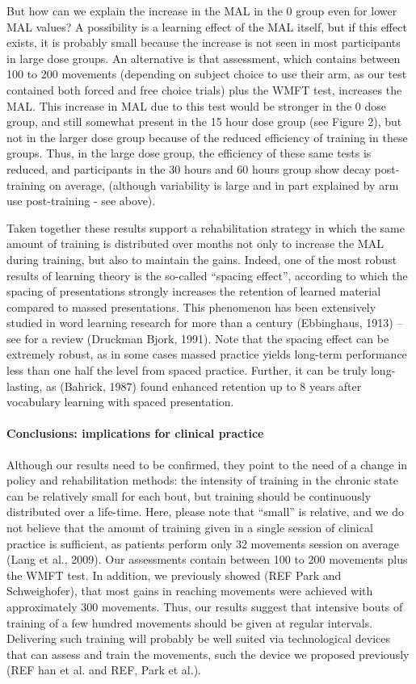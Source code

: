 But how can we explain the increase in the MAL in the 0 group even for lower MAL values? A possibility is a learning effect of the MAL itself, but if this effect exists, it is probably small because the increase is not seen in most participants in large dose groups. 
An alternative is that assessment, which contains between 100 to 200 movements (depending on subject choice to use their arm, as our test contained both forced and free choice trials) plus the WMFT test, increases the MAL. 
This increase in MAL due to this test would be stronger in the 0 dose group, and still somewhat present in the 15 hour dose group (see Figure 2), but not in the larger dose group because of the reduced efficiency of training in these groups. 
Thus, in the large dose group, the efficiency of these same tests is reduced, and participants in the 30 hours and 60 hours group show decay post-training on average, (although variability is large and in part explained by arm use post-training - see above). 

Taken together these results support a rehabilitation strategy in which the same amount of training is distributed over months not only to increase the MAL during training, but also to maintain the gains. 
Indeed, one of the most robust results of learning theory is the so-called “spacing effect”, according to which the spacing of presentations strongly increases the retention of learned material compared to massed presentations. 
This phenomenon has been extensively studied in word learning research for more than a century (Ebbinghaus, 1913) – see for a review (Druckman  Bjork, 1991). 
Note that the spacing effect can be extremely robust, as in some cases massed practice yields long-term performance less than one half the level from spaced practice. 
Further, it can be truly long-lasting, as (Bahrick, 1987) found enhanced retention up to 8 years after vocabulary learning with spaced presentation. 

\paragraph{Conclusions: implications for clinical practice}
Although our results need to be confirmed, they point to the need of a change in policy and rehabilitation methods: the intensity of training in the chronic state can be relatively small for each bout, but training should be continuously distributed over a life-time. 
Here, please note that “small” is relative, and we do not believe that the amount of training  given in a single session of clinical practice is sufficient, as patients perform only 32 movements session on average (Lang et al., 2009). 
Our assessments contain between 100 to 200 movements plus the WMFT test. 
In addition, we previously showed (REF Park and Schweighofer), that most gains in reaching movements were achieved with approximately 300 movements. 
Thus, our results suggest that intensive bouts of training of a few hundred movements should be given at regular intervals. 
Delivering such training will probably be well suited via technological devices that can assess and train the movements, such the device we proposed previously (REF han et al. and REF, Park et al.). 


